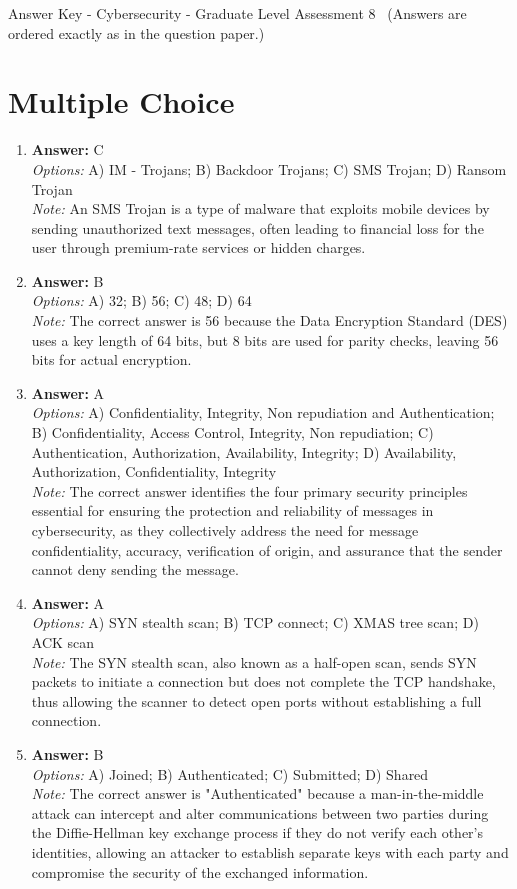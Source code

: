 \documentclass[12pt]{article}
\begin{document}
\begin{center}
Answer Key - Cybersecurity - Graduate Level Assessment 8 \
\small (Answers are ordered exactly as in the question paper.)
\end{center}

\section*{Multiple Choice}
\begin{enumerate}[label=\arabic*.]
\item \textbf{Answer:} C
\\ \textit{Options:} A) IM - Trojans; B) Backdoor Trojans; C) SMS Trojan; D) Ransom Trojan
\\ \textit{Note:} An SMS Trojan is a type of malware that exploits mobile devices by sending unauthorized text messages, often leading to financial loss for the user through premium-rate services or hidden charges.
\item \textbf{Answer:} B
\\ \textit{Options:} A) 32; B) 56; C) 48; D) 64
\\ \textit{Note:} The correct answer is 56 because the Data Encryption Standard (DES) uses a key length of 64 bits, but 8 bits are used for parity checks, leaving 56 bits for actual encryption.
\item \textbf{Answer:} A
\\ \textit{Options:} A) Confidentiality, Integrity, Non repudiation and Authentication; B) Confidentiality, Access Control, Integrity, Non repudiation; C) Authentication, Authorization, Availability, Integrity; D) Availability, Authorization, Confidentiality, Integrity
\\ \textit{Note:} The correct answer identifies the four primary security principles essential for ensuring the protection and reliability of messages in cybersecurity, as they collectively address the need for message confidentiality, accuracy, verification of origin, and assurance that the sender cannot deny sending the message.
\item \textbf{Answer:} A
\\ \textit{Options:} A) SYN stealth scan; B) TCP connect; C) XMAS tree scan; D) ACK scan
\\ \textit{Note:} The SYN stealth scan, also known as a half-open scan, sends SYN packets to initiate a connection but does not complete the TCP handshake, thus allowing the scanner to detect open ports without establishing a full connection.
\item \textbf{Answer:} B
\\ \textit{Options:} A) Joined; B) Authenticated; C) Submitted; D) Shared
\\ \textit{Note:} The correct answer is "Authenticated" because a man-in-the-middle attack can intercept and alter communications between two parties during the Diffie-Hellman key exchange process if they do not verify each other's identities, allowing an attacker to establish separate keys with each party and compromise the security of the exchanged information.
\end{enumerate}
\end{document}
